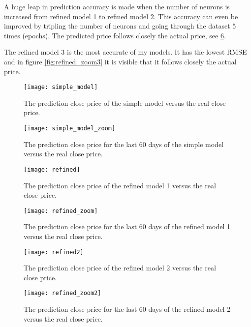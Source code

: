 \documentclass[fleqn,10pt]{SelfArx} %
\begin{document}
A huge leap in prediction accuracy is made when the number of neurons is increased from refined model 1 to refined model 2. This accuracy can even be improved by tripling the number of neurons and going through the dataset 5 times (epochs). The predicted price follows closely the actual price, see \ref{fig:refined_zoom2}. 

The refined model 3 is the most accurate of my models. It has the lowest RMSE and in figure \ref{fig:refined_zoom3} it is visible that it follows closely the actual price.





\begin{figure*}[htb]
    \centering %
\begin{subfigure}{0.85\columnwidth}
	\texttt{[image: simple\_model]}
	\caption{The prediction close price of the simple model versus the real close price.}
	\label{fig:simple}
\end{subfigure}\hfil %
\begin{subfigure}{0.85\columnwidth}
	\texttt{[image: simple\_model\_zoom]}
	\caption{The prediction close price for the last 60 days of the simple model versus the real close price.}
	\label{fig:simple_zoom}
\end{subfigure}
\begin{subfigure}{0.85\columnwidth}
	\texttt{[image: refined]}
	\caption{The prediction close price of the refined model 1 versus the real close price.}
	\label{fig:refined1}
\end{subfigure}\hfil %
\begin{subfigure}{0.85\columnwidth}
	\texttt{[image: refined\_zoom]}
	\caption{The prediction close price for the last 60 days of the refined model 1 versus the real close price.}
	\label{fig:refined_zoom1}
\end{subfigure}\hfil
\begin{subfigure}{0.85\columnwidth}
	\texttt{[image: refined2]}
	\caption{The prediction close price of the refined model 2 versus the real close price.}
	\label{fig:refined2}
\end{subfigure}\hfil %
\begin{subfigure}{0.85\columnwidth}
	\texttt{[image: refined\_zoom2]}
	\caption{The prediction close price for the last 60 days of the refined model 2 versus the real close price.}
	\label{fig:refined_zoom2}
\end{subfigure}\hfil

\end{figure*}
\end{document}
